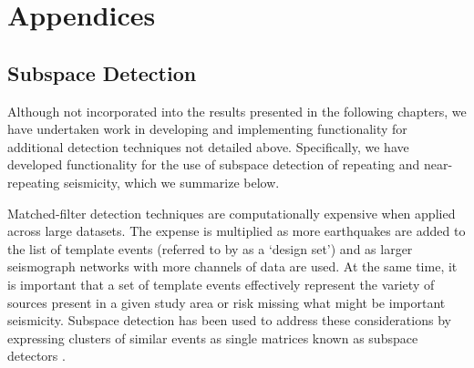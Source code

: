 \section{Appendices}
\subsection{Subspace Detection}
Although not incorporated into the results presented in the following chapters, we have undertaken work in developing and implementing functionality for additional detection techniques not detailed above. Specifically, we have developed functionality for the use of subspace detection of repeating and near-repeating seismicity, which we summarize below.

Matched-filter detection techniques are computationally expensive when applied
across large datasets. The expense is multiplied as more earthquakes are added
to the list of template events (referred to by \citet{Barrett_2014} as a `design set') and as larger seismograph networks with more channels of data are used. At the same time, it is important that a set of template events effectively represent the variety of sources present in a given study area or risk missing what might be important seismicity. Subspace detection has been used to address these considerations by expressing clusters of similar events as single matrices known as subspace detectors \citep[for example][]{Harris_2006a,Harris_2006, Barrett_2014,Chambers_2015}.

